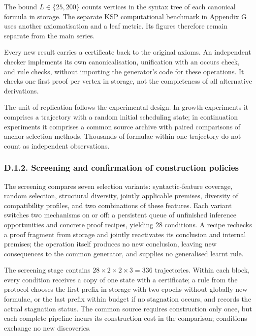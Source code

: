 \documentclass[pdflatex,sn-basic,Numbered]{sn-jnl}
\begin{document}
The bound \(L \in \{ 25,200\}\) counts vertices in the syntax tree of each canonical formula in storage. The separate KSP computational benchmark in Appendix G uses another axiomatisation and a leaf metric. Its figures therefore remain separate from the main series.

Every new result carries a certificate back to the original axioms. An independent checker implements its own canonicalisation, unification with an occurs check, and rule checks, without importing the generator's code for these operations. It checks one first proof per vertex in storage, not the completeness of all alternative derivations.

The unit of replication follows the experimental design. In growth experiments it comprises a trajectory with a random initial scheduling state; in continuation experiments it comprises a common source archive with paired comparisons of anchor-selection methods. Thousands of formulae within one trajectory do not count as independent observations.

\subsubsection*{D.1.2. Screening and confirmation of construction policies}\label{d.1.2.-screening-and-confirmation-of-construction-policies}

The screening compares seven selection variants: syntactic-feature coverage, random selection, structural diversity, jointly applicable premises, diversity of compatibility profiles, and two combinations of these features. Each variant switches two mechanisms on or off: a persistent queue of unfinished inference opportunities and concrete proof recipes, yielding 28 conditions. A recipe rechecks a proof fragment from storage and jointly reactivates its conclusion and internal premises; the operation itself produces no new conclusion, leaving new consequences to the common generator, and supplies no generalised learnt rule.

The screening stage contains \(28 \times 2 \times 2 \times 3 = 336\) trajectories. Within each block, every condition receives a copy of one state with a certificate; a rule from the protocol chooses the first prefix in storage with two epochs without globally new formulae, or the last prefix within budget if no stagnation occurs, and records the actual stagnation status. The common source requires construction only once, but each complete pipeline incurs its construction cost in the comparison; conditions exchange no new discoveries.
\end{document}
